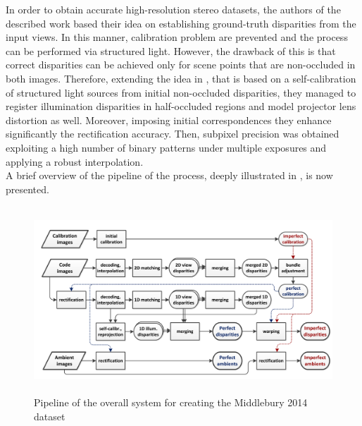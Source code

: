 In order to obtain accurate high-resolution stereo datasets, the authors of the described work based their idea on establishing ground-truth disparities from the input views.
In this manner, calibration problem are prevented and the process can be performed via structured light.
However, the drawback of this is that correct disparities can be achieved only for scene points that are non-occluded in both images.
Therefore, extending the idea in \cite{scharstein2003high}, that is based on a self-calibration of structured light sources from initial non-occluded disparities, they managed to register illumination disparities in half-occluded regions and model projector lens distortion as well. 
Moreover, imposing initial correspondences they enhance significantly the rectification accuracy.
Then, subpixel precision was obtained exploiting a high number of binary patterns under multiple exposures and applying a robust interpolation.\\
A brief overview of the pipeline of the process, deeply illustrated in \cite{Scharstein2014}, is now presented.\\

\begin{figure}[t]
	\begin{center}
		\includegraphics[width=.8\textwidth, height=7cm, keepaspectratio]{images/middlebury-2014-pipeline.png}
		\caption{Pipeline of the overall system for creating the Middlebury 2014 dataset \cite{Scharstein2014}}
		\label{fig:middleury-pipeline}
	\end{center}
\end{figure}

